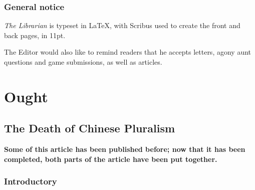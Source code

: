 \documentclass[11pt,a4paper]{report}
\begin{document}
\subsection{General notice}

\begin{multicols}{2}
	
	\textit{The Librarian} is typeset in \LaTeX, with Scribus used to create the front and back pages, in 11pt.
	
	The Editor would also like to remind readers that he accepts letters, agony aunt questions and game submissions, as well as articles. 

\end{multicols}

\chapter{Ought}\label{dialectic}

\section{The Death of Chinese Pluralism}

\textbf{Some of this article has been published before; now that it has been completed, both parts of the article have been put together.}

\subsection{Introductory}
\end{document}
